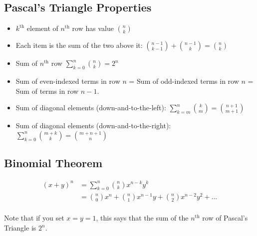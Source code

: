 \documentclass[12pt]{article}
\begin{document}
\subsection{Pascal's Triangle Properties}
\begin{itemize}
\item $k^{\text{th}}$ element of $n^{\text{th}}$ row has value $\binom{n}{k}$
\item Each item is the sum of the two above it: $\binom{n-1}{k-1} + \binom{n-1}{k} = \binom{n}{k}$
\item Sum of $n^{\text{th}}$ row $\sum_{k=0}^{n}\binom{n}{k}=2^n$
\item Sum of even-indexed terms in row $n$ = Sum of odd-indexed terms in row $n$ = Sum of terms in row $n-1$.
\item Sum of diagonal elements (down-and-to-the-left): $\sum_{k=m}^n \binom{k}{m} = \binom{n+1}{m+1}$
\item Sum of diagonal elements (down-and-to-the-right): $\sum_{k=0}^n \binom{m+k}{k} = \binom{m+n+1}{n}$
\end{itemize}
\subsection{Binomial Theorem}
\begin{align*}
    (x+y)^n &= \sum_{k=0}^n \binom{n}{k}x^{n-k}y^k\\
    &= \binom{n}{0}x^n + \binom{n}{1}x^{n-1}y + \binom{n}{2}x^{n-2}y^2 + \ldots\\
\end{align*}

Note that if you set $x=y=1$, this says that the sum of the $n^{\text{th}}$ row  of Pascal's Triangle is $2^n$.
\pagebreak
\end{document}
